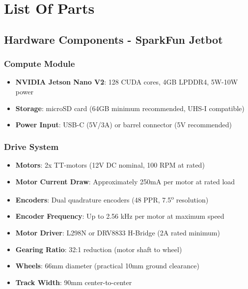 %
%

\chapter{List Of Parts}

\section{Hardware Components - SparkFun Jetbot}

\subsection{Compute Module}
\begin{itemize}
    \item \textbf{NVIDIA Jetson Nano V2}: 128 CUDA cores, 4GB LPDDR4, 5W-10W power
    \item \textbf{Storage}: microSD card (64GB minimum recommended, UHS-I compatible)
    \item \textbf{Power Input}: USB-C (5V/3A) or barrel connector (5V recommended)
\end{itemize}

\subsection{Drive System}
\begin{itemize}
    \item \textbf{Motors}: 2x TT-motors (12V DC nominal, 100 RPM at rated)
    \item \textbf{Motor Current Draw}: Approximately 250mA per motor at rated load
    \item \textbf{Encoders}: Dual quadrature encoders (48 PPR, 7.5\textsuperscript{o} resolution)
    \item \textbf{Encoder Frequency}: Up to 2.56 kHz per motor at maximum speed
    \item \textbf{Motor Driver}: L298N or DRV8833 H-Bridge (2A rated minimum)
    \item \textbf{Gearing Ratio}: 32:1 reduction (motor shaft to wheel)
    \item \textbf{Wheels}: 66mm diameter (practical 10mm ground clearance)
    \item \textbf{Track Width}: 90mm center-to-center
\end{itemize}


